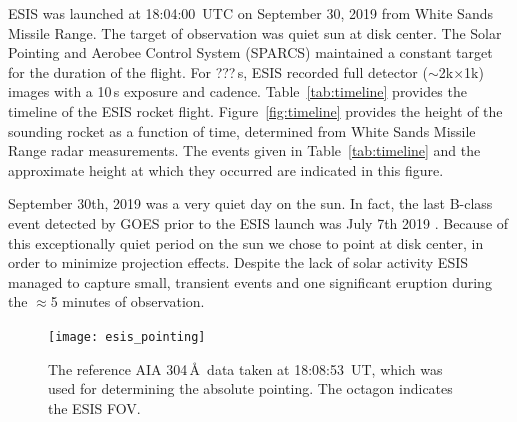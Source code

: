 		ESIS was launched at 18:04:00~UTC on September 30, 2019 from White Sands Missile Range.  
		The target of observation was quiet sun at disk center.  
		The Solar Pointing and Aerobee Control System (SPARCS) maintained a constant target for the duration of the flight.  
		For ???\,s, ESIS recorded full detector ($\sim$2k$\times$1k) images with a 10\,s exposure and cadence. 
		Table~\ref{tab:timeline} provides the timeline of the ESIS rocket flight. Figure~\ref{fig:timeline} provides the height of the sounding rocket as a function of time, determined from White Sands Missile Range radar measurements.  The events given in Table~\ref{tab:timeline} and the approximate height at which they occurred are indicated in this figure.

		September 30th, 2019 was a very quiet day on the sun.  
		In fact, the last  B-class event detected by GOES \citep{GOES} prior to the ESIS launch was July 7th 2019 .  
		Because of this exceptionally quiet period on the sun we chose to point at disk center, in order to minimize projection effects.  
		Despite the lack of solar activity ESIS managed to capture  small, transient events and one significant eruption during the $\approx$5 minutes of observation.
		
		\begin{figure}[ht]
			\begin{center}
				\texttt{[image: esis\_pointing]}
				\caption{The reference AIA 304\,\AA\ data taken at 18:08:53~UT, which was used for determining the absolute pointing. The octagon indicates the ESIS FOV.}
				\label{fig:fov}
			\end{center}
		\end{figure}
	
